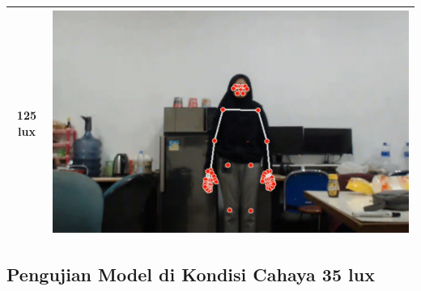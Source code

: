 \begin{longtable}{|c|c|}
  \hline
  125 lux            & \includegraphics[scale=0.3]{gambar/bab4-terang.png}                 \\
  \hline
\end{longtable}

\subsection{Pengujian Model di Kondisi Cahaya 35 lux}
\label{sec:analisiscahaya1}

